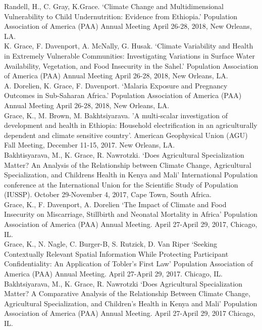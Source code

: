 \documentclass[11pt]{article} %
\begin{document}
\noindent
Randell, H., C. Gray, K.Grace. `Climate Change and Multidimensional Vulnerability to Child Undernutrition: Evidence from Ethiopia.' Population Association of America (PAA) Annual Meeting April 26-28, 2018, New Orleans, LA.\\

\noindent
K. Grace, F. Davenport, A. McNally, G. Husak. `Climate Variability and Health in Extremely Vulnerable Communities: Investigating Variations in Surface Water Availability, Vegetation, and Food Insecurity in the Sahel.' Population Association of America (PAA) Annual Meeting April 26-28, 2018, New Orleans, LA.\\

\noindent
A. Dorelien, K. Grace, F. Davenport. `Malaria Exposure and Pregnancy Outcomes in Sub-Saharan Africa.' Population Association of America (PAA) Annual Meeting April 26-28, 2018, New Orleans, LA.\\


\noindent
Grace, K., M. Brown, M. Bakhtsiyarava. 'A multi-scalar investigation of development and health in Ethiopia: Household electrification in an agriculturally dependent and climate sensitive country'. American Geophysical Union (AGU) Fall Meeting, December 11-15, 2017. New Orleans, LA.\\

\noindent
Bakhtisyarava, M., K. Grace, R. Nawrotzki. `Does Agricultural Specialization Matter? An Analysis of the Relationship between Climate Change, Agricultural Specialization, and Childrens Health in Kenya and Mali' International Population conference at the International Union for the Scientific Study of Population (IUSSP). October 29-November 4, 2017, Cape Town, South Africa.\\

\noindent
Grace, K.,  F. Davenport, A. Dorelien `The Impact of Climate and Food Insecurity on Miscarriage,
Stillbirth and Neonatal Mortality in Africa' Population Association of America (PAA) Annual Meeting.
April 27-April 29, 2017, Chicago, IL.\\

\noindent
Grace, K., N. Nagle, C. Burger-B, S. Rutzick, D. Van Riper `Seeking Contextually Relevant Spatial
Information While Protecting Participant Confidentiality: An Application of Tobler's First Law'
Population Association of America (PAA) Annual Meeting. April 27-April 29, 2017. Chicago, IL.\\

\noindent
Bakhtsiyarava, M.,  K. Grace, R. Nawrotzki `Does Agricultural Specialization Matter? A Comparative
Analysis of the Relationship Between Climate Change, Agricultural Specialization, and Children's Health
in Kenya and Mali' Population Association of America (PAA) Annual Meeting. April 27-April 29, 2017
Chicago, IL.\\
\end{document}
